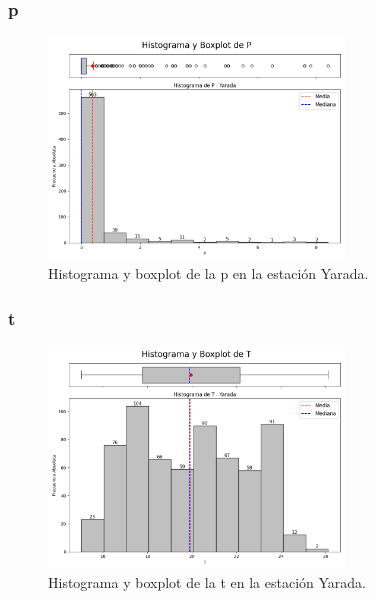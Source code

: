 \subsubsection*{\gls{p} }
\begin{figure}[htbp]
\centering
\includegraphics[width=0.7\textwidth]{resultados/por_estacion_meteorologica/Yarada/P_histograma.png}
\caption{Histograma y boxplot de la \gls{p}  en la estación Yarada.}
\label{fig:yarada_P}
\end{figure}

\subsubsection*{\gls{t} }
\begin{figure}[htbp]
\centering
\includegraphics[width=0.7\textwidth]{resultados/por_estacion_meteorologica/Yarada/T_histograma.png}
\caption{Histograma y boxplot de la \gls{t}  en la estación Yarada.}
\label{fig:yarada_T}
\end{figure}

